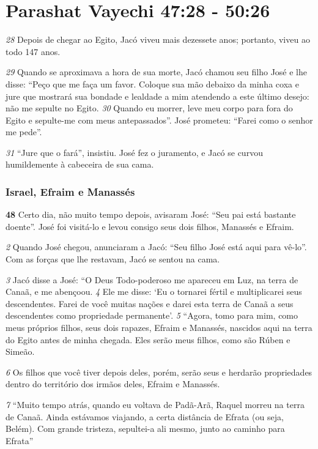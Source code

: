 \section*{Parashat Vayechi 47:28 - 50:26}


\bigskip
\textit{\tiny 28}
Depois de chegar ao Egito, Jacó viveu mais dezessete anos;
portanto, viveu ao todo 147 anos.

\bigskip
\textit{\tiny 29}
Quando se aproximava a hora de sua morte, Jacó
chamou seu filho José e
lhe disse: “Peço que me faça um favor. Coloque sua mão debaixo da minha coxa e
jure que mostrará sua bondade e lealdade a mim atendendo a este último desejo:
não me sepulte no Egito. 
\textit{\tiny 30}
Quando eu morrer, leve meu corpo para fora do Egito
e sepulte-me com meus antepassados”.
   José prometeu: “Farei como o senhor me pede”.

\bigskip
\textit{\tiny 31}
“Jure que o fará”, insistiu. José fez o juramento, e Jacó se curvou
humildemente à cabeceira de sua cama.

\bigskip
\subsubsection*{Israel, Efraim e Manassés}
  \textbf{\large 48} Certo dia, não muito tempo depois, avisaram José: “Seu pai está bastante
doente”. José foi visitá-lo e levou consigo seus dois filhos, Manassés e Efraim. 

\bigskip
\textit{\tiny 2} 
Quando José chegou, anunciaram a Jacó: “Seu filho José está aqui para vê-lo”.
Com as forças que lhe restavam, Jacó
se sentou na cama. 

\bigskip
\textit{\tiny 3} 
Jacó disse a José: “O Deus Todo-poderoso
me apareceu em Luz, na terra de
Canaã, e me abençoou. 
\textit{\tiny 4} 
Ele me disse: ‘Eu o tornarei fértil e multiplicarei seus
descendentes. Farei de você muitas nações e darei esta terra de Canaã a seus
descendentes como propriedade permanente’. 
\textit{\tiny 5} 
“Agora, tomo para mim, como meus próprios filhos, seus dois rapazes, Efraim
e Manassés, nascidos aqui na terra do Egito antes de minha chegada. Eles serão
meus filhos, como são Rúben e Simeão. 

\bigskip
\textit{\tiny 6} 
Os filhos que você tiver depois deles,
porém, serão seus e herdarão propriedades dentro do território dos irmãos deles,
Efraim e Manassés. 

\bigskip
\textit{\tiny 7} 
“Muito tempo atrás, quando eu voltava de Padã-Arã,
Raquel morreu na terra
de Canaã. Ainda estávamos viajando, a certa distância de Efrata (ou seja, Belém).
Com grande tristeza, sepultei-a ali mesmo, junto ao caminho para Efrata” 

